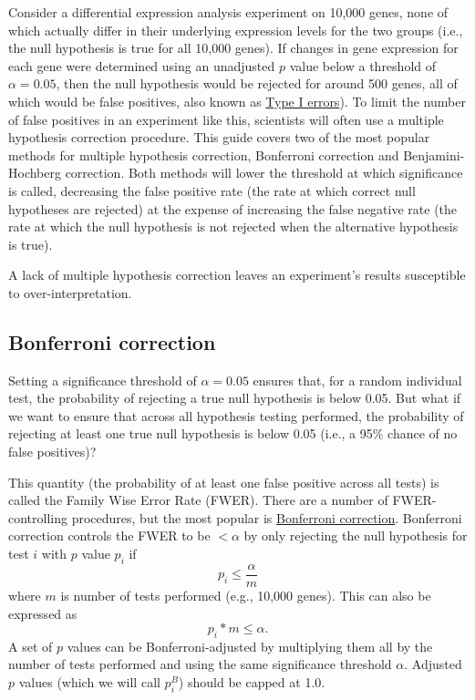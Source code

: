 \documentclass[letterpaper, 12pt]{article}
\begin{document}
Consider a differential expression analysis experiment on 10,000 genes, none of which actually differ in their underlying expression levels for the two groups (i.e., the null hypothesis is true for all 10,000 genes). If changes in gene expression for each gene were determined using an unadjusted $p$ value below a threshold of $\alpha = 0.05$, then the null hypothesis would be rejected for around 500 genes, all of which would be false positives, also known as \href{https://en.wikipedia.org/wiki/Type_I_and_type_II_errors}{Type I errors}). To limit the number of false positives in an experiment like this, scientists will often use a multiple hypothesis correction procedure. This guide covers two of the most popular methods for multiple hypothesis correction, Bonferroni correction and Benjamini-Hochberg correction. Both methods will lower the threshold at which significance is called, decreasing the false positive rate (the rate at which correct null hypotheses are rejected) at the expense of increasing the false negative rate (the rate at which the null hypothesis is not rejected when the alternative hypothesis is true).

A lack of multiple hypothesis correction leaves an experiment's results susceptible to over-interpretation. 

\subsection*{Bonferroni correction}

Setting a significance threshold of $\alpha = 0.05$
ensures that, for a random individual test, the probability of rejecting a true null hypothesis is below 0.05. But what if we want to ensure that across all hypothesis testing performed, the probability of rejecting at least one true null hypothesis is below 0.05 (i.e., a 95\% chance of no false positives)?

This quantity (the probability of at least one false positive across all tests) is called the Family Wise Error Rate (FWER). There are a number of FWER-controlling procedures, but the most popular is \href{https://en.wikipedia.org/wiki/Bonferroni_correction}{Bonferroni correction}. Bonferroni correction controls the FWER to be $< \alpha$ by only rejecting the null hypothesis for test $i$ with $p$ value $p_i$ if
$$p_i \leq \frac{\alpha}{m}$$
where $m$ is number of tests performed (e.g., 10,000 genes). This can also be expressed as
$$p_i * m \leq \alpha.$$
A set of $p$ values can be Bonferroni-adjusted by multiplying them all by the number of tests performed and using the same significance threshold $\alpha$. Adjusted $p$ values (which we will call $p_i^{B}$) should be capped at 1.0.
\end{document}
